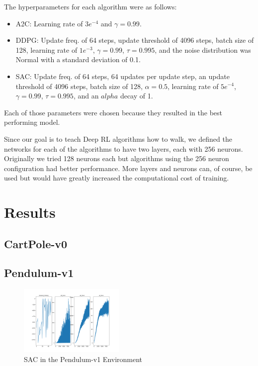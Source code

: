 \documentclass[conference]{IEEEtran}
\begin{document}
The hyperparameters for each algorithm were as follows:
\begin{itemize}
    \item A2C: Learning rate of $3e^{-4}$ and $\gamma = 0.99$.
    \item DDPG: Update freq. of 64 steps, update threshold of 4096 steps, batch size of 128, learning rate of $1e^{-3}$,
    $\gamma = 0.99$, $\tau = 0.995$, and the noise distribution was Normal with a standard deviation of 0.1.
    \item SAC: Update freq. of 64 steps, 64 updates per update step, an update threshold of 4096 steps, batch size of
    128, $\alpha = 0.5$, learning rate of $5e^{-4}$, $\gamma = 0.99$, $\tau = 0.995$, and an $alpha$ decay of 1.
\end{itemize}
Each of those parameters were chosen because they resulted in the best performing model.

Since our goal is to teach Deep RL algorithms how to walk, we defined the networks for each of the algorithms to have
two layers, each with 256 neurons. Originally we tried 128 neurons each but algorithms using the 256 neuron
configuration had better performance. More layers and neurons can, of course, be used but would have greatly increased
the computational cost of training.

\section{Results}

\blindtext

\subsection{CartPole-v0}

\blindtext

\subsection{Pendulum-v1}

\begin{figure}
    \includegraphics[width=0.45\textwidth]{sac-pendulum}
    \caption{SAC in the Pendulum-v1 Environment}
\end{figure}
\end{document}
